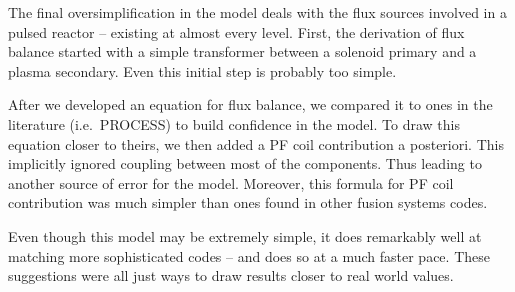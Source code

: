 The final oversimplification in the model deals with the flux sources involved in a pulsed reactor -- existing at almost every level. First, the derivation of flux balance started with a simple transformer between a solenoid primary and a plasma secondary. Even this initial step is probably too simple.

After we developed an equation for flux balance, we compared it to ones in the literature (i.e.\ PROCESS) to build confidence in the model. To draw this equation closer to theirs, we then added a PF coil contribution a posteriori. This implicitly ignored coupling between most of the components. Thus leading to another source of error for the model. Moreover, this formula for PF coil contribution was much simpler than ones found in other fusion systems codes.

Even though this model may be extremely simple, it does remarkably well at matching more sophisticated codes -- and does so at a much faster pace. These suggestions were all just ways to draw results closer to real world values.

%
